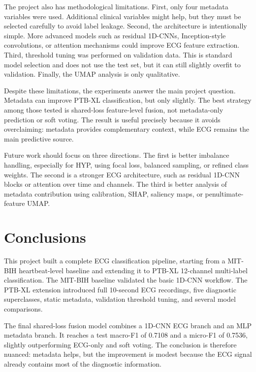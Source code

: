 \documentclass[11pt,a4paper]{article}
\begin{document}
The project also has methodological limitations. First, only four metadata variables were used. Additional clinical variables might help, but they must be selected carefully to avoid label leakage. Second, the architecture is intentionally simple. More advanced models such as residual 1D-CNNs, Inception-style convolutions, or attention mechanisms could improve ECG feature extraction. Third, threshold tuning was performed on validation data. This is standard model selection and does not use the test set, but it can still slightly overfit to validation. Finally, the UMAP analysis is only qualitative.

Despite these limitations, the experiments answer the main project question. Metadata can improve PTB-XL classification, but only slightly. The best strategy among those tested is shared-loss feature-level fusion, not metadata-only prediction or soft voting. The result is useful precisely because it avoids overclaiming: metadata provides complementary context, while ECG remains the main predictive source.

Future work should focus on three directions. The first is better imbalance handling, especially for HYP, using focal loss, balanced sampling, or refined class weights. The second is a stronger ECG architecture, such as residual 1D-CNN blocks or attention over time and channels. The third is better analysis of metadata contribution using calibration, SHAP, saliency maps, or penultimate-feature UMAP.

\section{Conclusions}

This project built a complete ECG classification pipeline, starting from a MIT-BIH heartbeat-level baseline and extending it to PTB-XL 12-channel multi-label classification. The MIT-BIH baseline validated the basic 1D-CNN workflow. The PTB-XL extension introduced full 10-second ECG recordings, five diagnostic superclasses, static metadata, validation threshold tuning, and several model comparisons.

The final shared-loss fusion model combines a 1D-CNN ECG branch and an MLP metadata branch. It reaches a test macro-F1 of 0.7108 and a micro-F1 of 0.7536, slightly outperforming ECG-only and soft voting. The conclusion is therefore nuanced: metadata helps, but the improvement is modest because the ECG signal already contains most of the diagnostic information.
\end{document}
